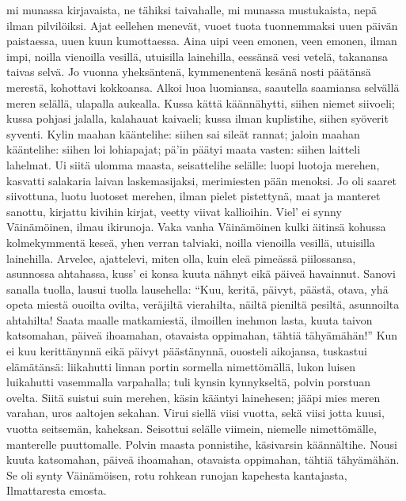     mi munassa kirjavaista,
    ne tähiksi taivahalle,
    mi munassa mustukaista,
    nepä ilman pilvilöiksi.
  \endverse
  \beginverse
    Ajat eellehen menevät,
    vuoet tuota tuonnemmaksi
    uuen päivän paistaessa,
    uuen kuun kumottaessa.
    Aina uipi veen emonen,
    veen emonen, ilman impi,
  \endverse
  \beginverse
    noilla vienoilla vesillä,
    utuisilla lainehilla,
    eessänsä vesi vetelä,
    takanansa taivas selvä.
    Jo vuonna yheksäntenä,
    kymmenentenä kesänä
    nosti päätänsä merestä,
    kohottavi kokkoansa.
    Alkoi luoa luomiansa,
    saautella saamiansa
  \endverse
  \beginverse
    selvällä meren selällä,
    ulapalla aukealla.
    Kussa kättä käännähytti,
    siihen niemet siivoeli;
    kussa pohjasi jalalla,
    kalahauat kaivaeli;
    kussa ilman kuplistihe,
    siihen syöverit syventi.
  \endverse
  \beginverse
    Kylin maahan kääntelihe:
    siihen sai sileät rannat;
  \endverse
  \beginverse
    jaloin maahan kääntelihe:
    siihen loi lohiapajat;
    pä'in päätyi maata vasten:
    siihen laitteli lahelmat.
    Ui siitä ulomma maasta,
    seisattelihe selälle:
    luopi luotoja merehen,
    kasvatti salakaria
    laivan laskemasijaksi,
    merimiesten pään menoksi.
  \endverse
  \beginverse
    Jo oli saaret siivottuna,
    luotu luotoset merehen,
    ilman pielet pistettynä,
    maat ja manteret sanottu,
    kirjattu kivihin kirjat,
    veetty viivat kallioihin.
    Viel' ei synny Väinämöinen,
    ilmau ikirunoja.
    Vaka vanha Väinämöinen
    kulki äitinsä kohussa
  \endverse
  \beginverse
    kolmekymmentä keseä,
    yhen verran talviaki,
    noilla vienoilla vesillä,
    utuisilla lainehilla.
    Arvelee, ajattelevi,
    miten olla, kuin eleä
    pimeässä piilossansa,
    asunnossa ahtahassa,
    kuss' ei konsa kuuta nähnyt
    eikä päiveä havainnut.
  \endverse
  \beginverse
    Sanovi sanalla tuolla,
    lausui tuolla lausehella:
    ``Kuu, keritä, päivyt, päästä,
    otava, yhä opeta
    miestä ouoilta ovilta,
    veräjiltä vierahilta,
    näiltä pieniltä pesiltä,
    asunnoilta ahtahilta!
    Saata maalle matkamiestä,
    ilmoillen inehmon lasta,
    kuuta taivon katsomahan,
    päiveä ihoamahan,
    otavaista oppimahan,
    tähtiä tähyämähän!''
    Kun ei kuu kerittänynnä
    eikä päivyt päästänynnä,
    ouosteli aikojansa,
    tuskastui elämätänsä:
    liikahutti linnan portin
    sormella nimettömällä,
  \endverse
  \beginverse
    lukon luisen luikahutti
    vasemmalla varpahalla;
    tuli kynsin kynnykseltä,
    polvin porstuan ovelta.
    Siitä suistui suin merehen,
    käsin kääntyi lainehesen;
    jääpi mies meren varahan,
    uros aaltojen sekahan.
  \endverse
  \beginverse
    Virui siellä viisi vuotta,
    sekä viisi jotta kuusi,
  \endverse
  \beginverse
    vuotta seitsemän, kaheksan.
    Seisottui selälle viimein,
    niemelle nimettömälle,
    manterelle puuttomalle.
    Polvin maasta ponnistihe,
    käsivarsin käännältihe.
    Nousi kuuta katsomahan,
    päiveä ihoamahan,
    otavaista oppimahan,
    tähtiä tähyämähän.
  \endverse
  \beginverse
    Se oli synty Väinämöisen,
    rotu rohkean runojan
    kapehesta kantajasta,
    Ilmattaresta emosta.
  \endverse
\endsong


